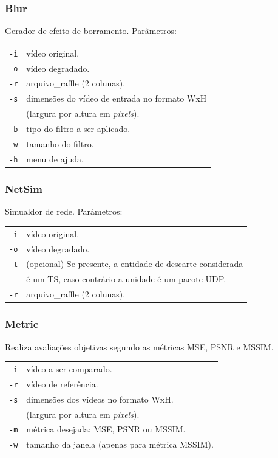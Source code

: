     \begin{frame}\frametitle{Blur}
        Gerador de efeito de borramento. Parâmetros:
        \begin{table}[!h]
	        \begin{tabular}{ll}
	            \texttt{-i}  & vídeo original. \\
	            \texttt{-o}  & vídeo degradado. \\
	            \texttt{-r}  & arquivo\_raffle (2 colunas). \\
	            \texttt{-s}  & dimensões do vídeo de entrada no formato WxH \\ 
	            & (largura por altura em \emph{pixels}). \\
	            \texttt{-b}  & tipo do filtro a ser aplicado. \\
	            \texttt{-w}  & tamanho do filtro. \\
	            \texttt{-h}  & menu de ajuda. \\
	        \end{tabular}
        \end{table}
    \end{frame}
    
    \begin{frame}\frametitle{NetSim}
        Simualdor de rede. Parâmetros:
        \begin{table}[!h]
	        \begin{tabular}{ll}
	            \texttt{-i}  & vídeo original. \\
	            \texttt{-o}  & vídeo degradado. \\
	            \texttt{-t}  & (opcional) Se presente, a entidade de descarte considerada \\
	            & é um TS, caso contrário a unidade é um pacote UDP. \\
	            \texttt{-r}  & arquivo\_raffle (2 colunas). \\
	        \end{tabular}
        \end{table}
    \end{frame}
    
    \begin{frame}\frametitle{Metric}
        Realiza avaliações objetivas segundo as métricas MSE, PSNR e MSSIM.
        \begin{table}[!h]
	        \begin{tabular}{ll}
	            \texttt{-i}  & vídeo a ser comparado. \\
	            \texttt{-r}  & vídeo de referência. \\
	            \texttt{-s}  & dimensões dos vídeos no formato WxH. \\ 
	            & (largura por altura em \emph{pixels}). \\
	            \texttt{-m}  & métrica desejada: MSE, PSNR ou MSSIM. \\
	            \texttt{-w}  & tamanho da janela (apenas para métrica MSSIM). \\
	        \end{tabular}
        \end{table}
    \end{frame}

